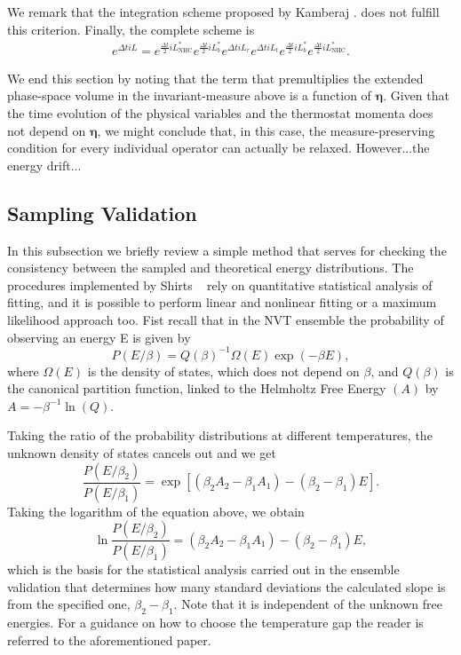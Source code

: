 \documentclass[aip,jcp,reprint,amsmath,amssymb]{revtex4-1}
\newcommand{\vt}[1]{\boldsymbol{\mathbf{#1}}}           %
\begin{document}
We remark that the integration scheme proposed by Kamberaj .\cite{Kamberaj2005} does not fulfill this criterion. 
Finally, the complete scheme is
\begin{equation}
\label{eq:modified_splitting}
\begin{split}
e^{\Delta t i\!L} = e^{\frac{\Delta t}{2} i\!L_\text{NHC}^\ast} e^{\frac{\Delta t}{2} i\!L_b^\ast} e^{\Delta t i\!L_r} e^{\Delta t i\!L_t}  e^{\frac{\Delta t}{2} i\!L_b^\ast} e^{\frac{\Delta t}{2} i\!L_\text{NHC}^\ast}.
\end{split}
\end{equation}

We end this section by noting that the term that premultiplies the extended phase-space volume in the invariant-measure above is a function of $\vt \eta$. Given that the time evolution of the physical variables and the thermostat momenta does not depend on $\vt \eta$, we might conclude that, in this case, the measure-preserving condition for every individual operator can actually be relaxed. However...the energy drift...

\subsection{Sampling Validation}
\label{sec:samplingvalidation}

In this subsection we briefly review a simple method that serves for checking the consistency between the sampled and theoretical energy distributions. The procedures implemented by Shirts ~\cite{Shirts2013} rely on quantitative statistical analysis of fitting, and it is possible to perform linear and nonlinear fitting or a maximum likelihood approach too. Fist recall that in the NVT ensemble the probability of observing an energy E is given by
\[
P(E/\beta) = Q(\beta)^{-1}\Omega(E)\exp\left(-\beta E\right),
\]
where $ \Omega(E) $ is the density of states, which does not depend on $ \beta $, and $ Q(\beta) $  is the canonical partition function, linked to the Helmholtz Free Energy $ (A) $ by $A = -\beta^{-1}\ln(Q)$. 

Taking the ratio of the probability distributions at different temperatures, the unknown density of states cancels out and we get
\begin{equation}
\frac{P(E/\beta_2)}{P(E/\beta_1)} = \exp\left[(\beta_2 A_2 - \beta_1 A_1) - (\beta_2 - \beta_1)E\right].
\end{equation}
Taking the logarithm of the equation above, we obtain
\begin{equation}
\label{eq:ln_probability_ratio}
\ln\frac{P(E/\beta_2)}{P(E/\beta_1)} = \left(\beta_2 A_2 - \beta_1 A_1\right) - \left(\beta_2 - \beta_1\right)E,
\end{equation}
which is the basis for the statistical analysis carried out in the ensemble validation that determines how many standard deviations the calculated slope is from the specified one,  $ \beta_2 - \beta_1 $. Note that it is independent of the unknown free energies. For a guidance on how to choose the temperature gap the reader is referred to the aforementioned paper.
\end{document}
